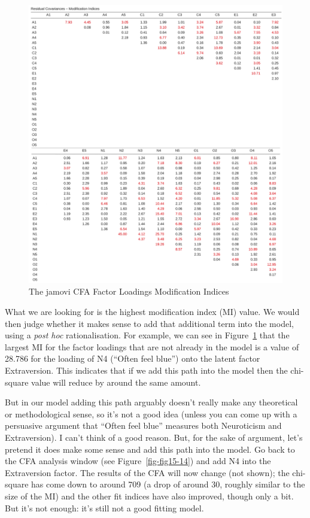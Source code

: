 \documentclass[
  a4paper,
]{book}
\begin{document}
\begin{figure}

\includegraphics[width=1\textwidth,height=\textheight]{images/fig15-18.png} \hfill{}

\caption{\label{fig-fig15-18}The jamovi CFA Factor Loadings Modification
Indices}

\end{figure}

What we are looking for is the highest modification index (MI) value. We
would then judge whether it makes sense to add that additional term into
the model, using a \emph{post hoc} rationalisation. For example, we can
see in Figure~\ref{fig-fig15-18} that the largest MI for the factor
loadings that are not already in the model is a value of 28.786 for the
loading of N4 (``Often feel blue'') onto the latent factor Extraversion.
This indicates that if we add this path into the model then the
chi-square value will reduce by around the same amount.

But in our model adding this path arguably doesn't really make any
theoretical or methodological sense, so it's not a good idea (unless you
can come up with a persuasive argument that ``Often feel blue'' measures
both Neuroticism and Extraversion). I can't think of a good reason. But,
for the sake of argument, let's pretend it does make some sense and add
this path into the model. Go back to the CFA analysis window (see
Figure~\ref{fig-fig15-14}) and add N4 into the Extraversion factor. The
results of the CFA will now change (not shown); the chi-square has come
down to around 709 (a drop of around 30, roughly similar to the size of
the MI) and the other fit indices have also improved, though only a bit.
But it's not enough: it's still not a good fitting model.
\end{document}
